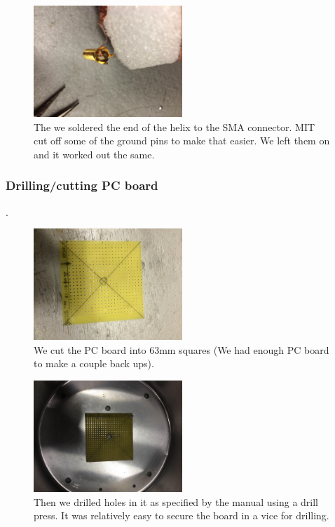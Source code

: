 \documentclass[11pt]{article} %
\begin{document}
\begin{figure}
  \centering
  \caption{ The we soldered the end of the helix to the SMA connector. MIT cut off some of the ground pins to make that easier. We left them on and it worked out the same.   }
  \includegraphics[width=0.50\textwidth]{feed/14.jpeg}
\end{figure}



\subsubsection{Drilling/cutting PC board}
.
\begin{figure}
  \centering
  \caption{  We cut the PC board into 63mm squares (We had enough PC board to make a couple back ups).  }
  \includegraphics[width=0.50\textwidth]{feed/15.jpeg}
\end{figure}


\begin{figure}
  \centering
  \caption{  Then we drilled holes in it as specified by the manual using a drill press. It was relatively easy to secure the board in a vice for drilling.  }
  \includegraphics[width=0.50\textwidth]{feed/16.jpeg}
\end{figure}
\end{document}

